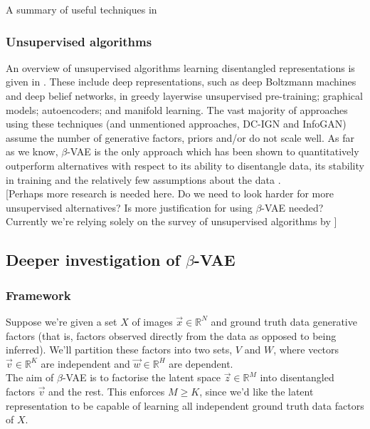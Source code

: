 \documentclass[12pt,twoside]{article}
\begin{document}
A summary of useful techniques in \cite{IanGoodfellowYoshuaBengio2015}


\subsubsection{Unsupervised algorithms}

An overview of unsupervised algorithms learning disentangled representations is given in \cite{Bengio2013}. These include deep representations, such as deep Boltzmann machines and deep belief networks, in greedy layerwise unsupervised pre-training; graphical models; autoencoders; and manifold learning. The vast majority of approaches using these techniques (and unmentioned approaches, DC-IGN and InfoGAN) assume the number of generative factors, priors and/or do not scale well. As far as we know, $\beta$-VAE is the only approach which has been shown to quantitatively outperform alternatives with respect to its ability to disentangle data, its stability in training and the relatively few assumptions about the data \cite{Higgins2016}.\\

[Perhaps more research is needed here. Do we need to look harder for more unsupervised alternatives? Is more justification for using $\beta$-VAE needed? Currently we're relying solely on the survey of unsupervised algorithms by \cite{Higgins2016}]\\

\subsection{Deeper investigation of $\beta$-VAE}
\subsubsection{Framework}

Suppose we're given a set $X$ of images $\vec{x}\in\mathbb{R}^N$ and ground truth data generative factors (that is, factors observed directly from the data as opposed to being inferred). We'll partition these factors into two sets, $V$ and $W$, where vectors $\vec{v}\in\mathbb{R}^K$ are independent and $\vec{w}\in\mathbb{R}^H$ are dependent.\\

The aim of $\beta$-VAE is to factorise the latent space $\vec{z}\in\mathbb{R}^M$ into disentangled factors $\vec{v}$ and the rest. This enforces $M\geq K$, since we'd like the latent representation to be capable of learning all independent ground truth data factors of $X$.\\
\end{document}
